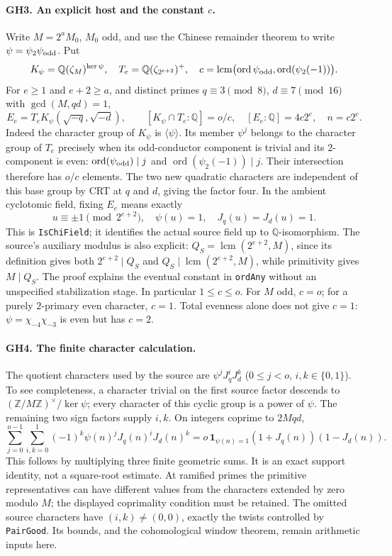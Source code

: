 \documentclass[11pt,a4paper]{article}
\numberwithin{equation}{section}
\theoremstyle{remark}\newtheorem{remark}[theorem]{Remark}
\begin{document}
\paragraph{GH3. An explicit host and the constant $c$.}
Write $M=2^aM_0$, $M_0$ odd, and use the Chinese remainder theorem to write
$\psi=\psi_2\psi_{\rm odd}$.  Put
\[
 K_\psi=\mathbb Q(\zeta_M)^{\ker\psi},\quad
 T_e=\mathbb Q(\zeta_{2^{e+2}})^+,\quad
 c=\operatorname{lcm}\bigl(\operatorname{ord}\psi_{\rm odd},
                  \operatorname{ord}(\psi_2(-1))\bigr).
\]
For $e\ge1$ and $e+2\ge a$, and distinct primes
$q\equiv3\pmod8$, $d\equiv7\pmod{16}$ with $\gcd(M,qd)=1$,
\[
 E_e=T_eK_\psi(\sqrt{-q},\sqrt{-d}),\qquad
 [K_\psi\cap T_e:\mathbb Q]=o/c,\quad
 [E_e:\mathbb Q]=4c2^e,\quad n=c2^e.                 \tag{GH3}
\]
Indeed the character group of $K_\psi$ is $\langle\psi\rangle$.
Its member $\psi^j$ belongs to the character group of $T_e$ precisely
when its odd-conductor component is trivial and its $2$-component is
even: $\operatorname{ord}(\psi_{\rm odd})\mid j$ and
$\operatorname{ord}(\psi_2(-1))\mid j$.  Their intersection therefore
has $o/c$ elements.  The two new quadratic characters are independent
of this base group by CRT at $q$ and $d$, giving the factor four.
In the ambient cyclotomic field, fixing $E_e$ means exactly
\[
 u\equiv\pm1\pmod{2^{e+2}},\quad \psi(u)=1,
 \quad J_q(u)=J_d(u)=1.
\]
This is \texttt{IsChiField}; it identifies the actual source field up to
$\mathbb Q$-isomorphism.  The source's auxiliary modulus is also explicit:
$Q_S=\operatorname{lcm}(2^{e+2},M)$, since its definition gives both
$2^{e+2}\mid Q_S$ and $Q_S\mid\operatorname{lcm}(2^{e+2},M)$,
while primitivity gives $M\mid Q_S$.
The proof explains the eventual constant in \texttt{ordAny} without
an unspecified stabilization stage.  In particular $1\le c\le o$.
For $M$ odd, $c=o$; for a purely $2$-primary even character, $c=1$.
Total evenness alone does not give $c=1$: $\psi=\chi_{-4}\chi_{-3}$
is even but has $c=2$.

\paragraph{GH4. The finite character calculation.}
The quotient characters used by the source are
$\psi^jJ_q^iJ_d^k$ ($0\le j<o$, $i,k\in\{0,1\}$).
To see completeness, a character trivial on the first source factor
descends to $(\mathbb Z/M\mathbb Z)^\times/\ker\psi$; every character
of this cyclic group is a power of $\psi$.  The remaining two sign
factors supply $i,k$.  On integers coprime to $2Mqd$,
\[
 \sum_{j=0}^{o-1}\sum_{i,k=0}^1
   (-1)^k\psi(n)^jJ_q(n)^iJ_d(n)^k
 =o\,\mathbf1_{\psi(n)=1}(1+J_q(n))(1-J_d(n)).       \tag{GH4}
\]
This follows by multiplying three finite geometric sums.
It is an exact support identity, not a square-root estimate.
At ramified primes the primitive representatives can have different
values from the characters extended by zero modulo $M$; the displayed
coprimality condition must be retained.
The omitted source characters have $(i,k)\ne(0,0)$, exactly the twists
controlled by \texttt{PairGood}.  Its bounds, and the cohomological
window theorem, remain arithmetic inputs here.
\end{document}
